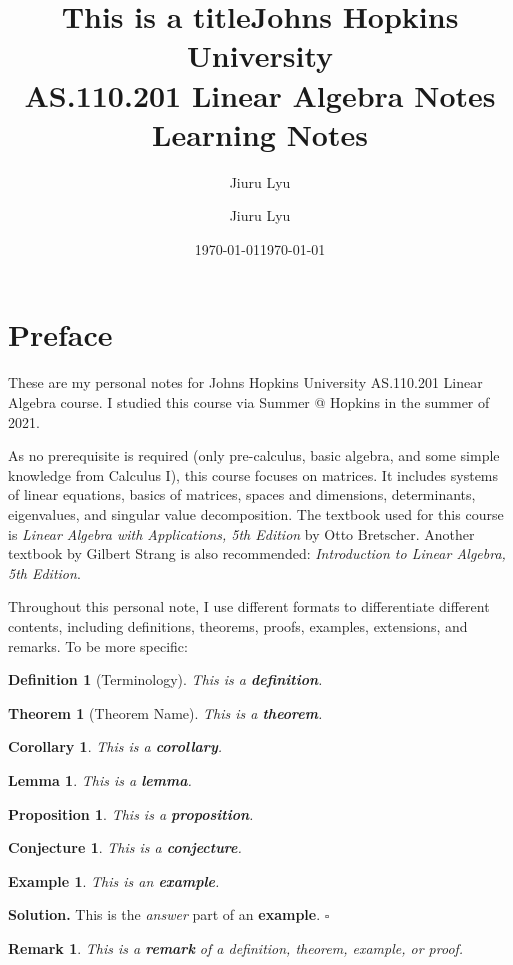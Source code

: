 \documentclass[12pt, a4paper]{article}
\title{\textbf{This is a title}}
\author{Jiuru Lyu}
\date{\today}
\title{Johns Hopkins University\\\textbf{AS.110.201 Linear Algebra Notes}\\Learning Notes}
\author{Jiuru Lyu}
\date{\today}
\newtheorem{thm}{Theorem}[subsection]
\newtheorem{df}{Definition}[subsection]
\newtheorem{eg}{Example}[subsection]
\newenvironment*{sol}{\indent\textbf{Solution. }}{\hfill{$\square$}\par}
\newtheorem*{rmk}{\indent Remark}
\newtheorem{cor}{Corollary}[subsection]
\newtheorem{lem}{Lemma}[subsection]
\newtheorem{prop}{Proposition}[subsection]
\newtheorem{conj}{Conjecture}[subsection]
\begin{document}
\maketitle

\tableofcontents

\newpage
\section*{Preface}
These are my personal notes for Johns Hopkins University AS.110.201 Linear Algebra course. I studied this course via Summer @ Hopkins in the summer of 2021. 

As no prerequisite is required (only pre-calculus, basic algebra, and some simple knowledge from Calculus I), this course focuses on matrices. It includes systems of linear equations, basics of matrices, spaces and dimensions, determinants, eigenvalues, and singular value decomposition. The textbook used for this course is \textit{Linear Algebra with Applications, 5th Edition} by Otto Bretscher. Another textbook by Gilbert Strang is also recommended: \textit{Introduction to Linear Algebra, 5th Edition}. 

Throughout this personal note, I use different formats to differentiate different contents, including definitions, theorems, proofs, examples, extensions, and remarks. To be more specific: 
\begin{df}[Terminology]
    This is a \textbf{definition}.	
\end{df}
\begin{thm}[Theorem Name]
    This is a \textbf{theorem}.	
\end{thm}
\begin{cor}
    This is a \textbf{corollary}.	
\end{cor}
\begin{lem}
    This is a \textbf{lemma}.	
\end{lem}
\begin{prop}
    This is a \textbf{proposition}.	
\end{prop}
\begin{conj}
    This is a \textbf{conjecture}.	
\end{conj}
\begin{eg}
    This is  an \textbf{example}. 
\end{eg}

\begin{sol}
    This is the \textit{answer} part of an \textbf{example}. 
\end{sol}
\begin{rmk}
	This is a \textbf{remark} of a definition, theorem, example, or proof. 
\end{rmk}
\end{document}
